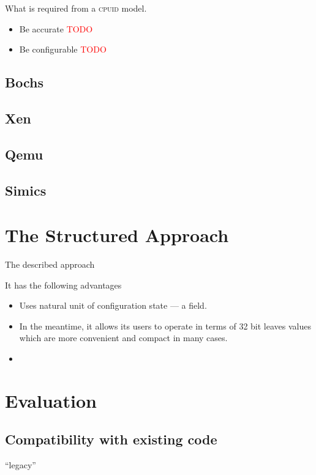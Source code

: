 \documentclass[a4paper,10pt,oneside,unicode]{article}
\newcommand{\cpuid}{\textsc{cpuid} }
\newcommand{\todo}[1][]{\textcolor{red}{TODO #1}}
\begin{document}
What is required from a \cpuid model.
\begin{itemize}
\item Be accurate \todo
\item Be configurable \todo
\end{itemize}

\subsection{Bochs}

\subsection{Xen}

\subsection{Qemu}

\subsection{Simics}

\section{The Structured Approach}

The described approach

It has the following advantages

\begin{itemize}
\item Uses natural unit of configuration state --- a field.
\item In the meantime, it allows its users to operate in terms of 32 bit leaves values which are more convenient and compact in many cases.
\item
\end{itemize}



\section{Evaluation}

\subsection{Compatibility with existing code}

“legacy” 
\end{document}
